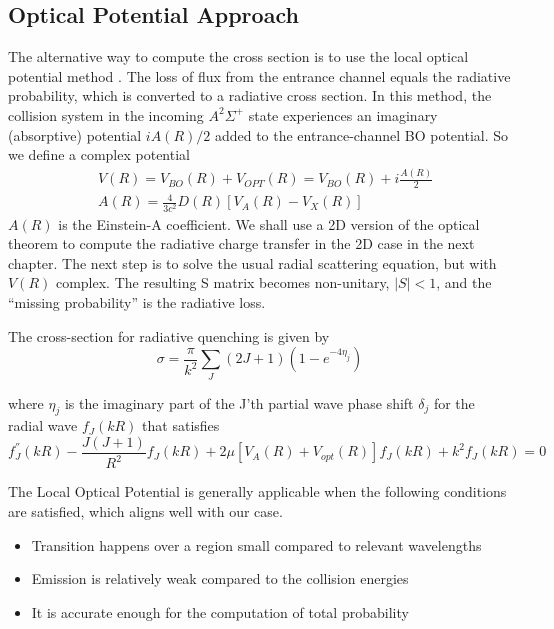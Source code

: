 \subsection{Optical Potential Approach}

The alternative way to compute the cross section is to use the local optical potential method \cite{Zygelman88}.  The loss of flux from the entrance channel equals the radiative probability, which is converted to a radiative cross section.
In this method, the collision system in the incoming $ A^2\Sigma^{+} $ state experiences an imaginary (absorptive) potential $ iA(R)/2 $ added to the entrance-channel BO potential.
So we define a complex potential 
\begin{equation}
\begin{split}
  & V(R) = V_{BO}(R) + V_{OPT}(R) = V_{BO}(R) + i\frac{A(R)}{2} \\[.8em]
  & A(R) = \frac{4}{3c^2}D(R)[V_A(R) - V_X(R)]
\end{split}
\end{equation}
$ A(R) $ is the Einstein-A coefficient. We shall use a 2D version of the optical theorem to compute the radiative charge transfer in the 2D case in the next chapter.
The next step is to solve the usual radial scattering equation, but with $ V(R) $ complex. The resulting S matrix becomes non-unitary, $ |S| < 1 $, and the “missing probability” is the radiative loss.

The cross-section for radiative quenching is given by
\begin{equation}\label{quenchR}
  \sigma = \frac{\pi}{k^2}\sum_J{(2J+1)(1 - e^{-4\eta_j})}
\end{equation}

where $ \eta_j $ is the imaginary part of the J'th partial wave phase shift $\delta_j $ for the radial wave $ f_J(kR) $ that satisfies
\begin{equation}\label{PartW3D}
  f_J^{''}(kR) - \frac{J(J+1)}{R^2}f_J(kR) + 2\mu [V_A(R) + V_{opt}(R)]f_J(kR) + k^2f_J(kR) = 0
\end{equation}

The Local Optical Potential is generally applicable when the following conditions are satisfied, which aligns well with our case.
\begin{itemize}
  \item Transition happens over a region small compared to relevant wavelengths
  \item Emission is relatively weak compared to the collision energies
  \item It is accurate enough for the computation of total probability
\end{itemize}

